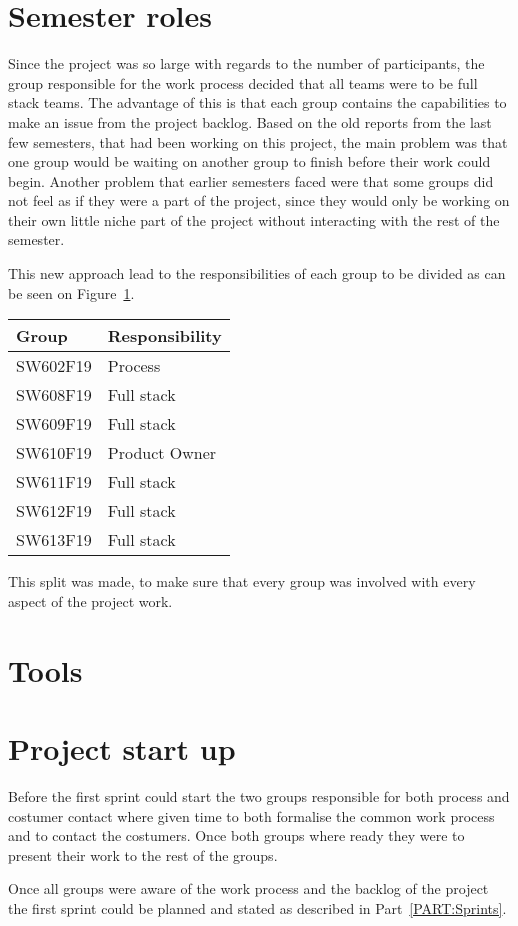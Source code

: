 \section{Semester roles}
Since the project was so large with regards to the number of participants, the group responsible for the work process decided that all teams were to be full stack teams.
The advantage of this is that each group contains the capabilities to make an issue from the project backlog.
Based on the old reports from the last few semesters, that had been working on this project, the main problem was that one group would be waiting on another group to finish before their work could begin.
Another problem that earlier semesters faced were that some groups did not feel as if they were a part of the project, since they would only be working on their own little niche part of the project without interacting with the rest of the semester.

This new approach lead to the responsibilities of each group to be divided as can be seen on Figure~\ref{TBL:GroupResponsibility}.

\begin{table}[H]
\centering
\begin{tabular}{|l|l|}
\hline
\textbf{Group} & \textbf{Responsibility} \\ \hline
SW602F19 & Process\\ \hline
SW608F19 & Full stack\\ \hline
SW609F19 & Full stack\\ \hline
SW610F19 & Product Owner  \\ \hline
SW611F19 & Full stack \\ \hline
SW612F19 & Full stack \\ \hline
SW613F19 & Full stack \\ \hline
\end{tabular}
\label{TBL:GroupResponsibility}
\end{table}

This split was made, to make sure that every group was involved with every aspect of the project work.

\section{Tools}

\section{Project start up}
Before the first sprint could start the two groups responsible for both process and costumer contact where given time to both formalise the common work process and to contact the costumers.
Once both groups where ready they were to present their work to the rest of the groups.

Once all groups were aware of the work process and the backlog of the project the first sprint could be planned and stated as described in Part~\ref{PART:Sprints}.
